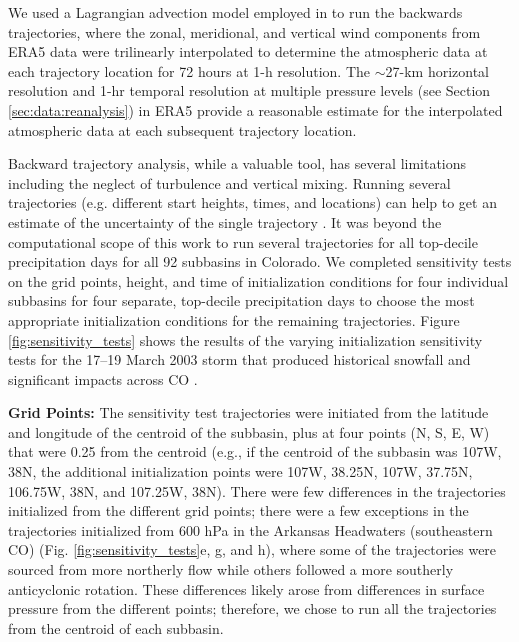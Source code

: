 \documentclass[draft]{agujournal2019}
\begin{document}
We used a Lagrangian advection model employed in  to run the backwards trajectories, where the zonal, meridional, and vertical wind components from ERA5 data were trilinearly interpolated to determine the atmospheric data at each trajectory location for 72 hours at 1-h resolution. The $\sim$27-km horizontal resolution and 1-hr temporal resolution at multiple pressure levels (see Section \ref{sec:data:reanalysis}) in ERA5 provide a reasonable estimate for the interpolated atmospheric data at each subsequent trajectory location.

Backward trajectory analysis, while a valuable tool, has several limitations including the neglect of turbulence and vertical mixing. Running several trajectories (e.g. different start heights, times, and locations) can help to get an estimate of the uncertainty of the single trajectory \cite{Stein2015NOAAsSystem}. It was beyond the computational scope of this work to run several trajectories for all top-decile precipitation days for all 92 subbasins in Colorado. We completed sensitivity tests on the grid points, height, and time of initialization conditions for four individual subbasins for four separate, top-decile precipitation days to choose the most appropriate initialization conditions for the remaining trajectories. Figure \ref{fig:sensitivity_tests} shows the results of the varying initialization sensitivity tests for the 17--19 March 2003 storm that produced historical snowfall and significant impacts across CO \cite{Wesley2013Extreme2003}.

\textbf{Grid Points:} The sensitivity test trajectories were initiated from the latitude and longitude of the centroid of the subbasin, plus at four points (N, S, E, W) that were 0.25\textdegree{} from the centroid (e.g., if the centroid of the subbasin was 107\textdegree W, 38\textdegree N, the additional initialization points were 107\textdegree W, 38.25\textdegree N, 107\textdegree W, 37.75\textdegree N, 106.75\textdegree W, 38\textdegree N, and 107.25\textdegree W, 38\textdegree N). There were few differences in the trajectories initialized from the different grid points; there were a few exceptions in the trajectories initialized from 600 hPa in the Arkansas Headwaters (southeastern CO) (Fig. \ref{fig:sensitivity_tests}e, g, and h), where some of the trajectories were sourced from more northerly flow while others followed a more southerly anticyclonic rotation. These differences likely arose from differences in surface pressure from the different points; therefore, we chose to run all the trajectories from the centroid of each subbasin.
\end{document}
